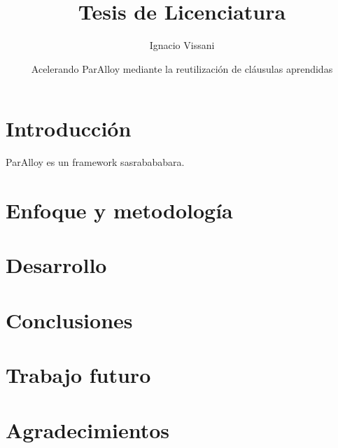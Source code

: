 \documentclass[a4paper, 11pt]{book}
\begin{document}
\author{Ignacio Vissani}
\title{Tesis de Licenciatura}
\date{Acelerando ParAlloy mediante la reutilización de cláusulas aprendidas}

\maketitle
\tableofcontents

\chapter{Introducción}
ParAlloy \cite{rosner:abz10} es un framework sasrabababara.

\chapter{Enfoque y metodología}
\chapter{Desarrollo}
\chapter{Conclusiones}
\chapter{Trabajo futuro}
\chapter{Agradecimientos}

{}

\end{document}
